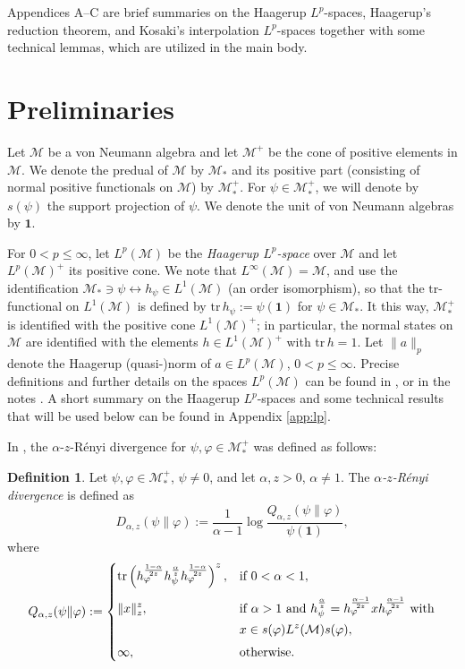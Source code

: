 \documentclass[12pt]{article}
\theoremstyle{definition}
\newtheorem{defi}[theorem]{Definition}
\theoremstyle{remark}
\numberwithin{equation}{section}
\def\Me{\mathcal M}
\def\Tr{\mathrm{tr}}
\def\1{\mathbf{1}}
\begin{document}
Appendices A--C are brief summaries on the Haagerup $L^p$-spaces, Haagerup's reduction theorem,
and Kosaki's interpolation $L^p$-spaces {\color{red}together} with some technical lemmas, which are
utilized in the main body.


\section{Preliminaries}


Let $\Me$ be a von Neumann algebra and let $\Me^+$ be the cone of positive elements in $\Me$. We
denote the predual of $\Me$ by $\Me_*$ and its positive part (consisting of normal positive
functionals on $\Me$) by $\Me_*^+$. For $\psi\in \Me_*^+$, we will denote by $s(\psi)$ the support
projection  of $\psi$. We denote the unit of von Neumann algebras by $\1$.

For $0< p\le \infty$, let $L^p(\Me)$ be the \emph{Haagerup $L^p$-space}
\cite{haagerup1979lpspaces,terp1981lpspaces} over $\Me$ and let $L^p(\Me)^+$ its positive cone. We
{note that $L^\infty(\Me)=\Me$, and use the identification
$\Me_*\ni \psi \leftrightarrow h_\psi\in L^1(\Me)$ (an order isomorphism)},
so that the $\Tr$-functional on $L^1(\Me)$ is defined by $\Tr\,h_\psi:=\psi(\1)$ for $\psi\in \Me_*$. It this way,
$\Me_*^+$ is identified with the positive cone $L^1(\Me)^+$; in particular, the normal states
on $\Me$ are identified with the elements $h\in L^1(\Me)^+$ with $\Tr\,h=1$. Let $\|a\|_p$ denote the
Haagerup (quasi-)norm of $a\in L^p(\Me)$, $0<p\le\infty$. Precise definitions and further details on
the spaces $L^p(\Me)$ can be found in \cite[Chap.~9]{hiai2021lectures}, or in the notes
\cite{terp1981lpspaces}. A short summary on the Haagerup $L^p$-spaces and some technical results
that will be used below can be found in Appendix \ref{app:lp}.


In \cite{kato2023aremark, kato2023onrenyi}, the
$\alpha$-$z$-R\'enyi divergence for $\psi,\varphi\in \mathcal M_*^+$  was defined as follows:

\begin{defi}\label{defi:renyi} Let $\psi,\varphi\in \Me_*^+$, $\psi\ne 0$, and let
$\alpha,z>0$, $\alpha\ne 1$. The \emph{$\alpha$-$z$-R\'enyi divergence} is defined as 
\[
D_{\alpha,z}(\psi\|\varphi):=\frac1{\alpha-1}\log
\frac{Q_{\alpha,z}(\psi\|\varphi)}{\psi(\1)},
\]
where
\[
Q_{\alpha,z}(\psi\|\varphi):=\begin{dcases} \Tr
\left(h_\varphi^{\frac{1-\alpha}{2z}}h_\psi^{\frac{\alpha}{z}}h_\varphi^{\frac{1-\alpha}{2z}}\right)^z, &
\text{if } 0<\alpha<1,\\[0.3em]
\|x\|_z^z, & \text{if } \alpha>1 \text{ and }
h_\psi^{\frac{\alpha}{z}}=h_\varphi^{\frac{\alpha-1}{2z}}xh_\varphi^{\frac{\alpha-1}{2z}}
\ \text{with}\\ & x\in s(\varphi)L^z(\Me)s(\varphi),\\[0.3em]
\infty,& \text{otherwise}.
\end{dcases}
\]
\end{defi}
\end{document}

